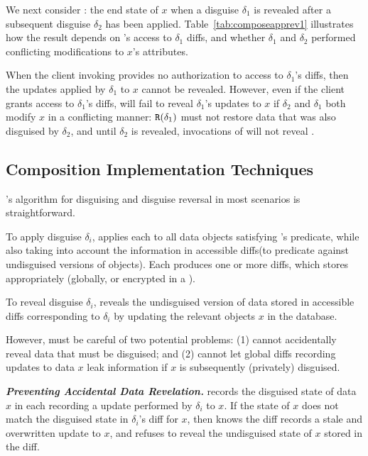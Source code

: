 We next consider \textbf{}: the end state of $x$ when a disguise
$\delta_1$ is revealed after a subsequent disguise $\delta_2$ has been applied. 
Table~\ref{tab:composeapprev1} illustrates how the result
depends on \sys's access to $\delta_1$ diffs, and whether $\delta_1$ and $\delta_2$ performed
conflicting modifications to $x$'s attributes.

When the client invoking  provides no authorization to access to $\delta_1$'s diffs, then the
updates applied by $\delta_1$ to $x$ cannot be revealed.  However, even if the client 
grants access to $\delta_1$'s diffs, \sys will fail to reveal $\delta_1$'s updates to $x$ if $\delta_2$ and $\delta_1$
both modify $x$ in a conflicting manner: $\texttt{R}({\delta_1})$ must not restore data that was also disguised by
$\delta_2$, and until $\delta_2$ is revealed, invocations of  will not reveal \xstart.

\subsection{Composition Implementation Techniques}
\sys's algorithm for disguising and disguise reversal in most scenarios is straightforward. 

To apply disguise $\delta_i$, \sys applies each  to all
data objects satisfying 's predicate, while also taking into account the information in
accessible diffs(to \eg predicate against undisguised versions of objects). Each  produces
one or more diffs, which \sys stores appropriately (globally, or encrypted in a ).

To reveal disguise $\delta_i$, \sys reveals the undisguised version of data stored in
accessible diffs corresponding to $\delta_i$ by updating the relevant objects $x$ in the database.

However, \sys must be careful of two potential problems:
(1) \sys cannot accidentally reveal data that must be disguised; and (2) \sys cannot let global
diffs recording updates to data $x$ leak information if $x$ is subsequently (privately) disguised.

\vspace{6pt}\noindent\textbf{\emph{Preventing Accidental Data Revelation.}}
\sys records the disguised state of data $x$ in each  recording a update performed by $\delta_i$
to $x$. If the state of $x$ does not match the disguised state in $\delta_i$'s diff for $x$, then \sys
knows the diff records a stale and overwritten update to $x$, and refuses to reveal the undisguised state of $x$
stored in the diff.

